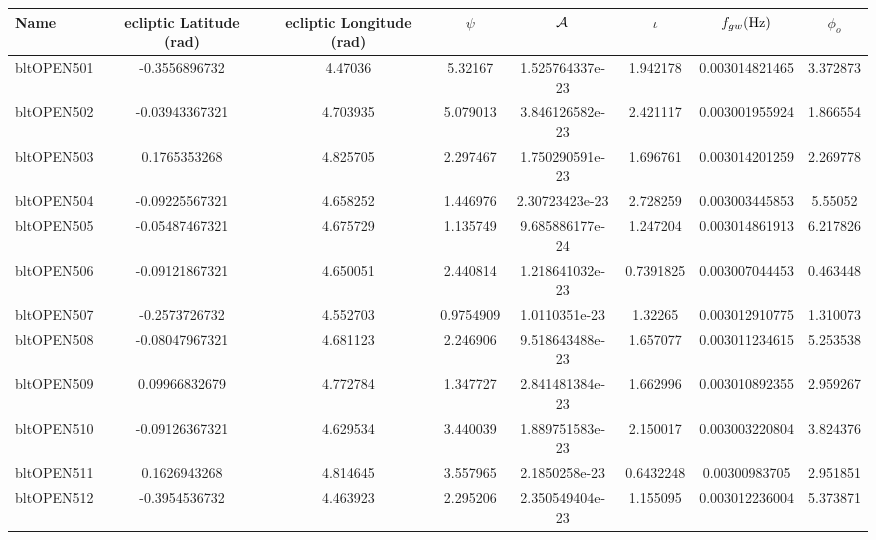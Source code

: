 \documentclass[11pt]{report}
\begin{document}
\begin{sidewaystable}
\centering
\tiny{
    \begin{tabular}{|l|c|c|c|c|c|c|c|}
    \hline \textbf{Name} & {\bf ecliptic Latitude (rad)} & {\bf ecliptic
    Longitude (rad)} & $\psi$ & $\cal A$ &$\iota$ & $f_{gw} ({\rm Hz})$ &
    $\phi_{o}$ \\
    \hline 
    bltOPEN501   & -0.3556896732   &       4.47036   &       5.32167   & 1.525764337e-23   &      1.942178   & 0.003014821465   &      3.372873\\
    bltOPEN502   & -0.03943367321   &      4.703935   &      5.079013   & 3.846126582e-23   &      2.421117   & 0.003001955924   &      1.866554\\
    bltOPEN503   &  0.1765353268   &      4.825705   &      2.297467   & 1.750290591e-23   &      1.696761   & 0.003014201259   &      2.269778\\
    bltOPEN504   & -0.09225567321   &      4.658252   &      1.446976   & 2.30723423e-23   &      2.728259   & 0.003003445853   &       5.55052\\
    bltOPEN505   & -0.05487467321   &      4.675729   &      1.135749   & 9.685886177e-24   &      1.247204   & 0.003014861913   &      6.217826\\
    bltOPEN506   & -0.09121867321   &      4.650051   &      2.440814   & 1.218641032e-23   &     0.7391825   & 0.003007044453   &      0.463448\\
    bltOPEN507   & -0.2573726732   &      4.552703   &     0.9754909   & 1.0110351e-23   &       1.32265   & 0.003012910775   &      1.310073\\
    bltOPEN508   & -0.08047967321   &      4.681123   &      2.246906   & 9.518643488e-23   &      1.657077   & 0.003011234615   &      5.253538\\
    bltOPEN509   & 0.09966832679   &      4.772784   &      1.347727   & 2.841481384e-23   &      1.662996   & 0.003010892355   &      2.959267\\
    bltOPEN510   & -0.09126367321   &      4.629534   &      3.440039   & 1.889751583e-23   &      2.150017   & 0.003003220804   &      3.824376\\
    bltOPEN511   &  0.1626943268   &      4.814645   &      3.557965   & 2.1850258e-23   &     0.6432248   & 0.00300983705   &      2.951851\\
    bltOPEN512   & -0.3954536732   &      4.463923   &      2.295206   & 2.350549404e-23   &      1.155095   & 0.003012236004   &      5.373871\\

\end{tabular}}
\end{sidewaystable}
\end{document}
